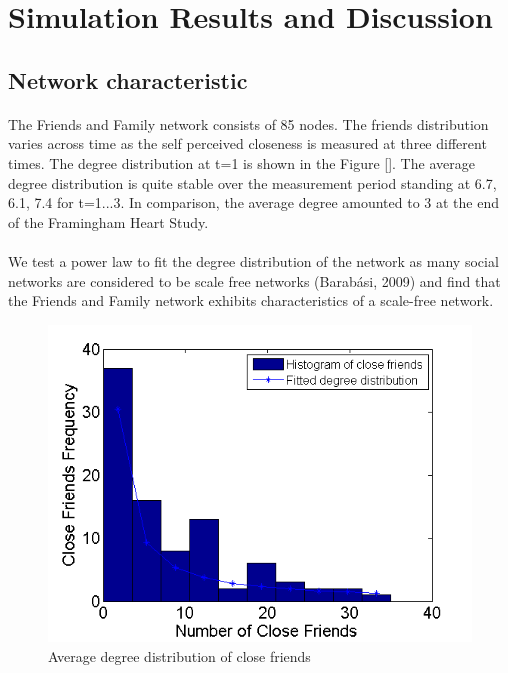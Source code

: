 \documentclass[11pt]{article}
\begin{document}
\section{Simulation Results and Discussion}

\subsection{Network characteristic}
\paragraph{}
The Friends and Family network consists of 85 nodes. The friends distribution varies across time as the self perceived closeness is measured at three different times. The degree distribution at t=1 is shown in the Figure []. The average degree distribution is quite stable over the measurement period standing at 6.7, 6.1, 7.4 for t=1...3. In comparison, the average degree amounted to 3 at the end of the Framingham Heart Study.

\paragraph{}
We test a power law to fit the degree distribution of the network as many social networks are considered to be scale free networks (Barabási, 2009) and find that the Friends and Family network exhibits characteristics of a scale-free network.

\begin{figure}[!ht]
\center
   \includegraphics[scale = 0.9]{friends_distribution_figure1.png}
   \caption{\label{1} Average degree distribution of close friends}
\end{figure}
\end{document}
